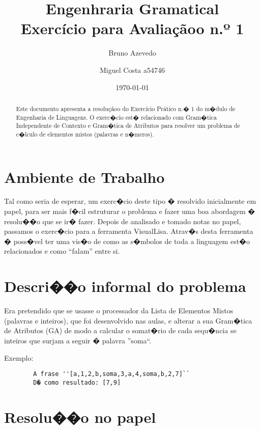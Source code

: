 \documentclass[a4paper]{article}
\title{Engenhraria Gramatical\\ Exercício para Avaliaçãoo n.º 1  }
\author{Bruno Azevedo \and Miguel Costa a54746}
\date{\today}
\begin{document}
\maketitle

\begin{abstract}
Este documento apresenta a resoluçãoo do Exercício Prático n.� 1 do m�dulo de Engenharia de Linguagens.
O exerc�cio est� relacionado com Gram�tica Independente de Contexto e Gram�tica de Atributos para resolver um problema
de c�lculo de elementos mistos (palavras e n�meros).
\end{abstract}

\newpage

\parskip=0mm
\tableofcontents
\parskip=2mm

\newpage

\section{Ambiente de Trabalho}
Tal como seria de esperar, um exerc�cio deste tipo � resolvido
inicialmente em papel, para ser mais f�cil estruturar o problema e
fazer uma boa abordagem � resolu��o que se ir� fazer.
Depois de analisado e tomado notas no papel, passamos o exerc�cio
para a ferramenta VisualLisa. Atrav�s desta ferramenta � poss�vel
ter uma vis�o de como as s�mbolos de toda a linguagem est�o relacionados
e como ``falam'' entre si.

\section{Descri��o informal do problema}
Era pretendido que se usasse o processador da Lista de Elementos Mistos (palavras e inteiros), 
que foi desenvolvido nas aulas, e alterar a sua Gram�tica de Atributos (GA) de modo a calcular o 
somat�rio de cada sequ�ncia se inteiros que surjam a seguir � palavra ''soma``.

Exemplo:
\begin{verbatim}
        A frase ''[a,1,2,b,soma,3,a,4,soma,b,2,7]``
        D� como resultado: [7,9]  
\end{verbatim}


\section{Resolu��o no papel}
\end{document}
